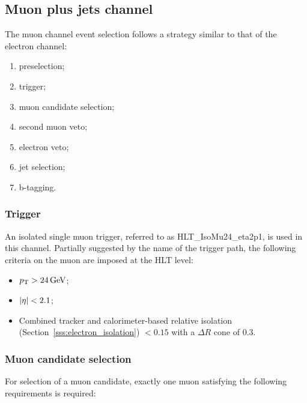 \subsection{Muon plus jets channel}
\label{ss_xsection:mujets}
The muon channel event selection follows a strategy similar to that of the electron channel:

\begin{enumerate}[topsep=\parskip, parsep=\parskip, itemsep=\parskip, leftmargin=\leftmargin]
	\item preselection;
	\item trigger;
	\item muon candidate selection;
	\item second muon veto;
	\item electron veto;
	\item jet selection;
	\item b-tagging.
\end{enumerate}

\subsubsection*{Trigger}
An isolated single muon trigger, referred to as HLT\_IsoMu24\_eta2p1, is used in this channel. Partially suggested by
the name of the trigger path, the following criteria on the muon are imposed at the HLT level:

\begin{itemize}
	\item $\pt > \SI{24}{\GeV}$;
	\item $\lvert \eta \rvert < 2.1$;
	\item Combined tracker and calorimeter-based relative isolation (Section~\ref{sss:electron_isolation}) \reliso $<
0.15$ with a $\Delta R$ cone of 0.3.

\end{itemize}

\subsubsection*{Muon candidate selection}
For selection of a muon candidate, exactly one muon satisfying the following requirements is required:

